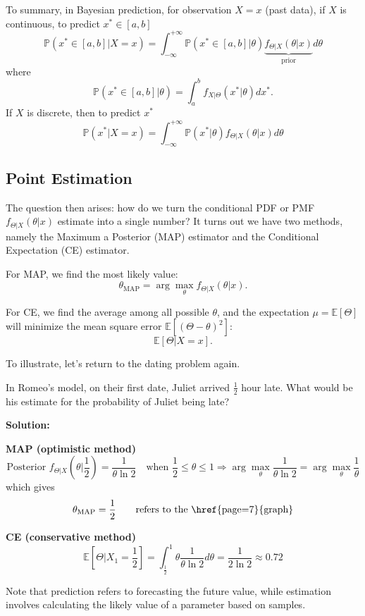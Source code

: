 To summary, in Bayesian prediction, for observation \(X = x\) (past data), if \(X\) is continuous, to predict \(x^* \in [a, b]\) 
\[
  \mathbb{P}(x^* \in [a, b] \vert X = x) = \int_{-\infty}^{+\infty} \mathbb{P}(x^* \in [a, b] \vert \theta) \underbrace{f_{\Theta \vert X} (\theta \vert x)}_{\text{prior}} d \theta
\]
where 
\[
  \mathbb{P}(x^* \in [a, b] \vert \theta) = \int_a^b f_{X \vert \Theta} (x^* \vert \theta) dx^*.
\]
If \(X\) is discrete, then to predict \(x^*\)
\[
  \mathbb{P}(x^* \vert X = x) = \int_{-\infty}^{+\infty} \mathbb{P}(x^* \vert \theta) f_{\Theta \vert X} (\theta \vert x) d \theta 
\] 

\subsection{Point Estimation}
The question then arises: how do we turn the conditional PDF or PMF \(f_{\Theta \vert X} (\theta \vert x)\) estimate into a single number? It turns out we have two methods, namely the Maximum a Posterior (MAP) estimator and the Conditional Expectation (CE) estimator. 

For MAP, we find the most likely value: 
\[
  \theta_{\text{MAP}} = \arg \max_{\theta} f_{\Theta \vert X} (\theta \vert x).
\]

For CE, we find the average among all possible \(\theta\), and the expectation \(\mu = \mathbb{E}[\Theta]\) will minimize the mean square error \(\mathbb{E}[(\Theta - \theta)^2]\): 
\[
  \mathbb{E}[\Theta \vert X = x]. 
\] 

To illustrate, let's return to the dating problem again. 
\begin{eg}
  In Romeo's model, on their first date, Juliet arrived \(\frac{1}{2}\) hour late. What would be his estimate for the probability of Juliet being late?

  \textbf{Solution:} 

  \textbf{MAP (optimistic method)}
  \[
      \text{Posterior } f_{\Theta \vert X} (\theta \vert \frac{1}{2}) = \dfrac{1}{\theta \ln 2}\quad \text{when } \frac{1}{2} \leq \theta \leq 1 \Longrightarrow \arg \max_\theta \dfrac{1}{\theta \ln 2} = \arg \max_\theta \frac{1}{\theta}
  \]
    which gives 
  \[
      \theta_{\text{MAP}} = \frac{1}{2} \quad\quad \text{refers to the \href{page=7}{graph}}
  \]

  \textbf{CE (conservative method)} 
  \[
    \mathbb{E}[\Theta \vert X_1 = \dfrac{1}{2}] = \int_{\frac{1}{2}}^1 \theta \dfrac{1}{\theta \ln 2} d \theta = \dfrac{1}{2\ln 2} \approx0.72
  \]
\end{eg}
\begin{remark}
  Note that prediction refers to forecasting the future value, while estimation involves calculating the likely value of a parameter based on samples.
\end{remark}

